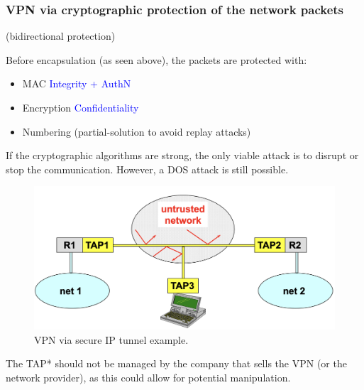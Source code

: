 \subsubsection{VPN via cryptographic protection of the network packets}

\begin{center}
    (bidirectional protection)
\end{center}

Before encapsulation (as seen above), the packets are protected with:
\begin{itemize}
    \item MAC \textcolor{Blue}{Integrity + AuthN}
    \item Encryption \textcolor{Blue}{Confidentiality}
    \item Numbering (partial-solution to avoid replay attacks)
\end{itemize}

\begin{tcolorbox}[colback=blue!10!white, colframe=blue!50!white, title=How to Damage the Communication?] 
    If the cryptographic algorithms are strong, the only viable attack is to disrupt or stop the communication. However, a DOS attack is still possible.
\end{tcolorbox}

\begin{figure}[H]
    \includegraphics[width=\linewidth]{Images/NetSec/vpn_via_encrypt_tunnel.png}
    \caption{VPN via secure IP tunnel example.}    
\end{figure}

\begin{tcolorbox}[colback=red!10!white, colframe=red!70!black, coltitle=white, title=Be aware] 
    The TAP* should not be managed by the company that sells the VPN (or the network provider), as this could allow for potential manipulation.
\end{tcolorbox}

